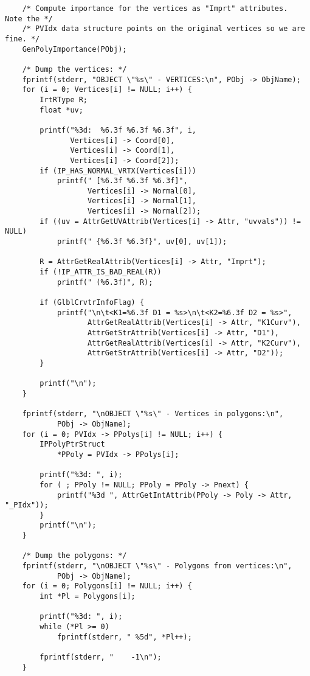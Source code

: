 \begin{verbatim}
    /* Compute importance for the vertices as "Imprt" attributes.  Note the */
    /* PVIdx data structure points on the original vertices so we are fine. */
    GenPolyImportance(PObj);

    /* Dump the vertices: */
    fprintf(stderr, "OBJECT \"%s\" - VERTICES:\n", PObj -> ObjName);
    for (i = 0; Vertices[i] != NULL; i++) {
        IrtRType R;
        float *uv;

        printf("%3d:  %6.3f %6.3f %6.3f", i,
               Vertices[i] -> Coord[0], 
               Vertices[i] -> Coord[1], 
               Vertices[i] -> Coord[2]);
        if (IP_HAS_NORMAL_VRTX(Vertices[i]))
            printf(" [%6.3f %6.3f %6.3f]",
                   Vertices[i] -> Normal[0], 
                   Vertices[i] -> Normal[1], 
                   Vertices[i] -> Normal[2]);
        if ((uv = AttrGetUVAttrib(Vertices[i] -> Attr, "uvvals")) != NULL)
            printf(" {%6.3f %6.3f}", uv[0], uv[1]);

        R = AttrGetRealAttrib(Vertices[i] -> Attr, "Imprt");
        if (!IP_ATTR_IS_BAD_REAL(R))
            printf(" (%6.3f)", R);

        if (GlblCrvtrInfoFlag) {
            printf("\n\t<K1=%6.3f D1 = %s>\n\t<K2=%6.3f D2 = %s>",
                   AttrGetRealAttrib(Vertices[i] -> Attr, "K1Curv"),
                   AttrGetStrAttrib(Vertices[i] -> Attr, "D1"),
                   AttrGetRealAttrib(Vertices[i] -> Attr, "K2Curv"),
                   AttrGetStrAttrib(Vertices[i] -> Attr, "D2"));
        }

        printf("\n");
    }

    fprintf(stderr, "\nOBJECT \"%s\" - Vertices in polygons:\n",
            PObj -> ObjName);
    for (i = 0; PVIdx -> PPolys[i] != NULL; i++) {
        IPPolyPtrStruct
            *PPoly = PVIdx -> PPolys[i];

        printf("%3d: ", i);
        for ( ; PPoly != NULL; PPoly = PPoly -> Pnext) {
            printf("%3d ", AttrGetIntAttrib(PPoly -> Poly -> Attr, "_PIdx"));
        }
        printf("\n");
    }

    /* Dump the polygons: */
    fprintf(stderr, "\nOBJECT \"%s\" - Polygons from vertices:\n",
            PObj -> ObjName);
    for (i = 0; Polygons[i] != NULL; i++) {
        int *Pl = Polygons[i];

        printf("%3d: ", i);
        while (*Pl >= 0)
            fprintf(stderr, " %5d", *Pl++);

        fprintf(stderr, "    -1\n");
    }


\end{verbatim}
